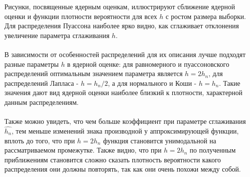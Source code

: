 \documentclass[../main.tex]{subfiles}
\begin{document}
    \noindent Рисунки, посвященные ядерным оценкам, иллюстрируют сближение ядерной оценки и функции плотности вероятности для всех $h$ с ростом размера выборки. Для распределения Пуассона наиболее ярко видно, как сглаживает отклонения увеличение параметра сглаживания $h$.\\\\

    \noindent В зависимости от особенностей распределений для их описания лучше подходят разные параметры $h$ в ядерной оценке: для равномерного и пуассоновского распределений оптимальным значением параметра является $h=2h_n$, для распределений Лапласа - $h=h_n/2$, а для нормального и Коши - $h = h_n$. Такие значения дают вид ядерной оценки наиболее близкий к плотности, характерной данным распределениям.\\\\

    \noindent Также можно увидеть, что чем больше коэффициент при параметре сглаживания $\hat{h_n}$, тем меньше изменений знака производной у аппроксимирующей функции, вплоть до того, что при $h=2h_n$ функция становится унимодальной на рассматриваемом промежутке. Также видно, что при $h=2h_n$ по полученным приближениям становится сложно сказать плотность вероятности какого распределения они должны повторять, так как они очень похожи между собой.
\end{document}
